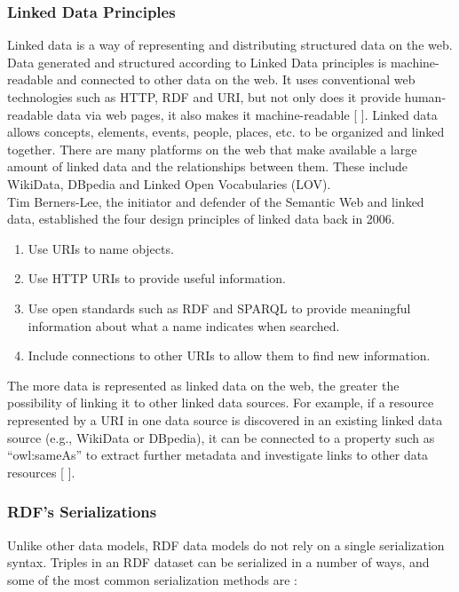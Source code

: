     \subsubsection{Linked Data Principles}
    Linked data is a way of representing and distributing structured data on the web. Data generated and structured according to Linked Data principles is machine-readable and connected to other data on the web. It uses conventional web technologies such as HTTP, RDF and URI, but not only does it provide human-readable data via web pages, it also makes it machine-readable [ ]. Linked data allows concepts, elements, events, people, places, etc. to be organized and linked together. There are many platforms on the web that make available a large amount of linked data and the relationships between them. These include WikiData, DBpedia and Linked Open Vocabularies (LOV).\\

    Tim Berners-Lee, the initiator and defender of the Semantic Web and linked data, established the four design principles of linked data back in 2006.
    \begin{enumerate}
        \item Use URIs to name objects.
        \item Use HTTP URIs to provide useful information. 
        \item Use open standards such as RDF and SPARQL to provide meaningful information about what a name indicates when searched. 
        \item Include connections to other URIs to allow them to find new information. 
    \end{enumerate}

    The more data is represented as linked data on the web, the greater the possibility of linking it to other linked data sources. For example, if a resource represented by a URI in one data source is discovered in an existing linked data source (e.g., WikiData or DBpedia), it can be connected to a property such as “owl:sameAs” to extract further metadata and investigate links to other data resources [ ].\\

    \subsubsection{RDF's Serializations}
    Unlike other data models, RDF data models do not rely on a single serialization syntax. Triples in an RDF dataset can be serialized in a number of ways, and some of the most common serialization methods are : 

